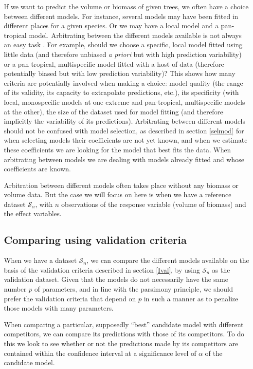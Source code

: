 If we want to predict the volume or biomass of given trees, we often have a choice between different models. For instance, several models may have been fitted in different places for a given species. Or we may have a local model and a pan-tropical model. Arbitrating between the different models available is not always an easy task \citep{henry11}.
For example, should we choose a specific, local model fitted using little data (and therefore unbiased \textit{a priori} but with high prediction variability) or a pan-tropical, multispecific model fitted with a host of data (therefore potentially biased but with low prediction variability)? This shows how many criteria are potentially involved when making a choice: model quality (the range of its validity, its capacity to extrapolate predictions, etc.), its specificity (with local, monospecific models at one extreme and pan-tropical, multispecific models at the other), the size of the dataset used for model fitting (and therefore implicitly the variability of its predictions). Arbitrating between different models should not be confused with model selection, as described in section \ref{selmod} for when selecting models their coefficients are not yet known, and when we estimate these coefficients we are looking for the model that best fits the data. When arbitrating between models we are dealing with models already fitted and whose coefficients are known.

Arbitration between different models often takes place without any biomass or volume data. But the case we will focus on here is when we have a reference dataset $\mathcal{S}_n$, with $n$ observations of the response variable (volume of biomass) and the effect variables.

\subsection{Comparing using validation criteria}

When we have a dataset 
$\mathcal{S}_n$, we can compare the different models available on the basis of the validation criteria described in section \ref{Ival}, by using $\mathcal{S}_n$ as the validation dataset. Given that the models do not necessarily have the same number $p$ of parameters, and in line with the parsimony principle, we should prefer the validation criteria that depend on $p$ in such a manner as to penalize those models with many parameters.

When comparing a particular, supposedly ``best'' candidate model with different competitors, we can compare its predictions with those of its competitors. To do this we look to see whether or not the predictions made by its competitors are contained within the confidence interval at a significance level of $\alpha$ of the candidate model.

